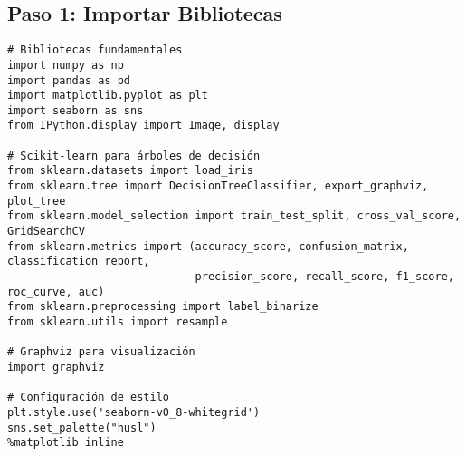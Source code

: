 \documentclass[12pt]{article}
\begin{document}
\subsection{Paso 1: Importar Bibliotecas}
\begin{lstlisting}
# Bibliotecas fundamentales
import numpy as np
import pandas as pd
import matplotlib.pyplot as plt
import seaborn as sns
from IPython.display import Image, display

# Scikit-learn para árboles de decisión
from sklearn.datasets import load_iris
from sklearn.tree import DecisionTreeClassifier, export_graphviz, plot_tree
from sklearn.model_selection import train_test_split, cross_val_score, GridSearchCV
from sklearn.metrics import (accuracy_score, confusion_matrix, classification_report, 
                             precision_score, recall_score, f1_score, roc_curve, auc)
from sklearn.preprocessing import label_binarize
from sklearn.utils import resample

# Graphviz para visualización
import graphviz

# Configuración de estilo
plt.style.use('seaborn-v0_8-whitegrid')
sns.set_palette("husl")
%matplotlib inline
\end{lstlisting}
\end{document}
